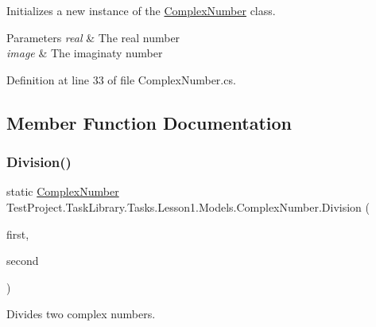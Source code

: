 Initializes a new instance of the \mbox{\hyperlink{class_test_project_1_1_task_library_1_1_tasks_1_1_lesson1_1_1_models_1_1_complex_number}{Complex\+Number}} class. 


\begin{DoxyParams}{Parameters}
{\em real} & The real number\\
\hline
{\em image} & The imaginaty number\\
\hline
\end{DoxyParams}


Definition at line 33 of file Complex\+Number.\+cs.



\subsection{Member Function Documentation}
\mbox{\label{class_test_project_1_1_task_library_1_1_tasks_1_1_lesson1_1_1_models_1_1_complex_number_a577008020627f4644b0f3a480e4342ff}} 
\subsubsection{\texorpdfstring{Division()}{Division()}}
{\footnotesize\ttfamily static \mbox{\hyperlink{class_test_project_1_1_task_library_1_1_tasks_1_1_lesson1_1_1_models_1_1_complex_number}{Complex\+Number}} Test\+Project.\+Task\+Library.\+Tasks.\+Lesson1.\+Models.\+Complex\+Number.\+Division (\begin{DoxyParamCaption}\item[{\mbox{\hyperlink{class_test_project_1_1_task_library_1_1_tasks_1_1_lesson1_1_1_models_1_1_complex_number}{Complex\+Number}}}]{first,  }\item[{\mbox{\hyperlink{class_test_project_1_1_task_library_1_1_tasks_1_1_lesson1_1_1_models_1_1_complex_number}{Complex\+Number}}}]{second }\end{DoxyParamCaption})\hspace{0.3cm}{\ttfamily [static]}}



Divides two complex numbers. 


